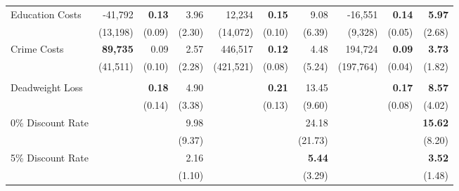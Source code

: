 \begin{tabular}{l r r r r r r r r r}
Education Costs	&	-41,792	&	\textbf{0.13}	&	3.96	&	12,234	&	\textbf{0.15}	&	9.08	&	-16,551	&	\textbf{0.14}	&	\textbf{5.97}	\\
	&	(13,198)	&	(0.09)	&	(2.30)	&	(14,072)	&	(0.10)	&	(6.39)	&	(9,328)	&	(0.05)	&	(2.68)	\\
Crime Costs	&	\textbf{89,735}	&	0.09	&	2.57	&	446,517	&	\textbf{0.12}	&	4.48	&	194,724	&	\textbf{0.09}	&	\textbf{3.73}	\\
	&	(41,511)	&	(0.10)	&	(2.28)	&	(421,521)	&	(0.08)	&	(5.24)	&	(197,764)	&	(0.04)	&	(1.82)	\\ \\
Deadweight Loss	&		&	\textbf{0.18}	&	4.90	&		&	\textbf{0.21}	&	13.45	&		&	\textbf{0.17}	&	\textbf{8.57}	\\
	&		&	(0.14)	&	(3.38)	&		&	(0.13)	&	(9.60)	&		&	(0.08)	&	(4.02)	\\
0\% Discount Rate	&		&		&	9.98	&		&		&	24.18	&		&		&	\textbf{15.62}	\\
	&		&		&	(9.37)	&		&		&	(21.73)	&		&		&	(8.20)	\\
5\% Discount Rate	&		&		&	2.16	&		&		&	\textbf{5.44}	&		&		&	\textbf{3.52}	\\
	&		&		&	(1.10)	&		&		&	(3.29)	&		&		&	(1.48)	\\
\bottomrule																			
\end{tabular}																			
